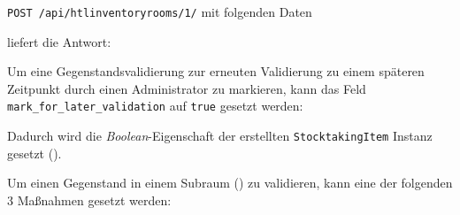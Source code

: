 \texttt{POST\ /api/htlinventoryrooms/1/} mit folgenden Daten

\begin{Shaded}
\begin{Highlighting}[]
\FunctionTok{\{}
    \FunctionTok{:} \FunctionTok{,}
    \FunctionTok{:} \OtherTok{[}
        \FunctionTok{\{}
            \FunctionTok{:} 
        \FunctionTok{\}}\OtherTok{,}
        \FunctionTok{\{}
            \FunctionTok{:} 
        \FunctionTok{\}}
    \OtherTok{]}
\FunctionTok{\}}
\end{Highlighting}
\end{Shaded}

liefert die Antwort:

\begin{Shaded}
\begin{Highlighting}[]
\FunctionTok{\{}
    \FunctionTok{:} \OtherTok{[}
    \OtherTok{]}
\FunctionTok{\}}
\end{Highlighting}
\end{Shaded}

Um eine Gegenstandsvalidierung zur erneuten Validierung zu einem
späteren Zeitpunkt durch einen Administrator zu markieren, kann das Feld
\texttt{mark\_for\_later\_validation} auf \texttt{true} gesetzt werden:

\begin{Shaded}
\begin{Highlighting}[]
\FunctionTok{\{}
    \FunctionTok{:} \FunctionTok{,}
    \FunctionTok{:} \OtherTok{[}
        \FunctionTok{\{}
            \FunctionTok{:} \FunctionTok{,}
            \FunctionTok{:} 
        \FunctionTok{\}}
    \OtherTok{]}
\FunctionTok{\}}
\end{Highlighting}
\end{Shaded}

Dadurch wird die
\emph{Boolean}-Eigenschaft
der erstellten \texttt{StocktakingItem} Instanz gesetzt
().

Um einen Gegenstand in einem Subraum () zu
validieren, kann eine der folgenden 3 Maßnahmen gesetzt werden:

